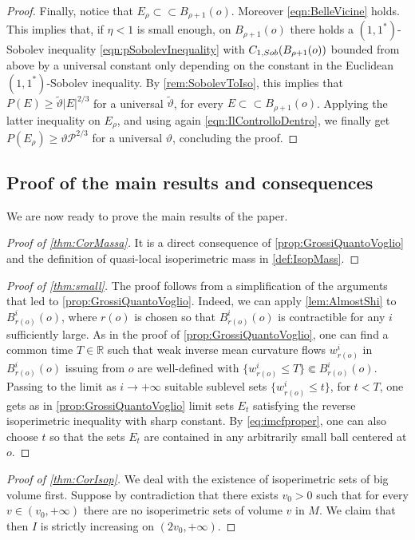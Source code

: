 \documentclass[a4paper,12pt,reqno]{amsart}
\numberwithin{equation}{section}
\theoremstyle{plain}
\theoremstyle{definition}
\theoremstyle{remark}
\newcommand{\R}{\mathbb{R}}
\begin{document}
{\begin{proof}
    Finally, notice that $E_\rho \subset\subset B_{\rho+1}(o)$. Moreover \eqref{eqn:BelleVicine} holds. This implies that, if $\eta<1$ is small enough, on $B_{\rho+1}(o)$ there holds a $(1,1^*)$-Sobolev inequality \eqref{eqn:pSobolevInequality} with $C_{1, {\rm Sob}}(B_{\rho+1}(o))$ bounded from above by a universal constant only depending on the constant in the Euclidean $(1,1^*)$-Sobolev inequality. By \cref{rem:SobolevToIso}, this implies that $P(E)\geq \tilde{\vartheta}|E|^{2/3}$ for a universal $\tilde{\vartheta}$, for every $E\subset\subset B_{\rho+1}(o)$. Applying the latter inequality on $E_\rho$, and using again \eqref{eqn:IlControlloDentro}, we finally get $P(E_\rho)\geq \vartheta \mathscr{P}^{2/3}$ for a universal $\vartheta$, concluding the proof.
\end{proof}

\subsection{Proof of the main results and consequences}

We are now ready to prove the main results of the paper.

\begin{proof}[Proof of \cref{thm:CorMassa}]
It is a direct consequence of \cref{prop:GrossiQuantoVoglio} and the definition of quasi-local isoperimetric mass in \cref{def:IsopMass}.
\end{proof}


\begin{proof}[Proof of \cref{thm:small}]
The proof follows from a simplification of the arguments that led to \cref{prop:GrossiQuantoVoglio}. Indeed, we can apply \cref{lem:AlmostShi} to $B^i_{r(o)}(o)$, where $r(o)$ is chosen so that $B^i_{r(o)}(o)$ is contractible for any $i$ sufficiently large. As in the proof of \cref{prop:GrossiQuantoVoglio}, one can find a common time $T\in\R$ such that weak inverse mean curvature flows $w^i_{r(o)}$ in $B^i_{r(o)}(o)$ issuing from $o$ are well-defined with $\{w^i_{r(o)} \le T\} \Subset B^i_{r(o)}(o)$. Passing to the limit as $i \to +\infty$ suitable sublevel sets $\{w^i_{r(o)} \leq t\}$, for $t < T$, one gets as in \cref{prop:GrossiQuantoVoglio} limit sets $E_t$ satisfying the reverse isoperimetric inequality with sharp constant. By \eqref{eq:imcfproper}, one can also choose $t$ so that the sets $E_t$ are contained in any arbitrarily small ball centered at $o$.
\end{proof}


\begin{proof}[Proof of \cref{thm:CorIsop}]
We deal with the existence of isoperimetric sets of big volume first.
Suppose by contradiction that there exists $v_0 >0$ such that for every $v\in (v_0,+\infty)$ there are no isoperimetric sets of volume $v$ in $M$. We claim that then $I$ is strictly increasing on $(2v_0,+\infty)$.


\end{proof}}
\end{document}
